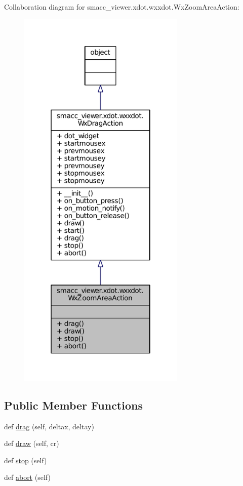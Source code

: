 Collaboration diagram for smacc\+\_\+viewer.\+xdot.\+wxxdot.\+Wx\+Zoom\+Area\+Action\+:
\nopagebreak
\begin{figure}[H]
\begin{center}
\leavevmode
\includegraphics[width=226pt]{classsmacc__viewer_1_1xdot_1_1wxxdot_1_1WxZoomAreaAction__coll__graph}
\end{center}
\end{figure}
\subsection*{Public Member Functions}
\begin{DoxyCompactItemize}
\item 
def \hyperlink{classsmacc__viewer_1_1xdot_1_1wxxdot_1_1WxZoomAreaAction_a8bde998350d4d12fb3dfffa87b8d07a4}{drag} (self, deltax, deltay)
\item 
def \hyperlink{classsmacc__viewer_1_1xdot_1_1wxxdot_1_1WxZoomAreaAction_a203918c48b4324c6570e3eed9bea767c}{draw} (self, cr)
\item 
def \hyperlink{classsmacc__viewer_1_1xdot_1_1wxxdot_1_1WxZoomAreaAction_ab26399a0b0e6f106b93a79ed702c129f}{stop} (self)
\item 
def \hyperlink{classsmacc__viewer_1_1xdot_1_1wxxdot_1_1WxZoomAreaAction_a4972bc535da1c8ca50f3dfa5b2aaa551}{abort} (self)
\end{DoxyCompactItemize}
